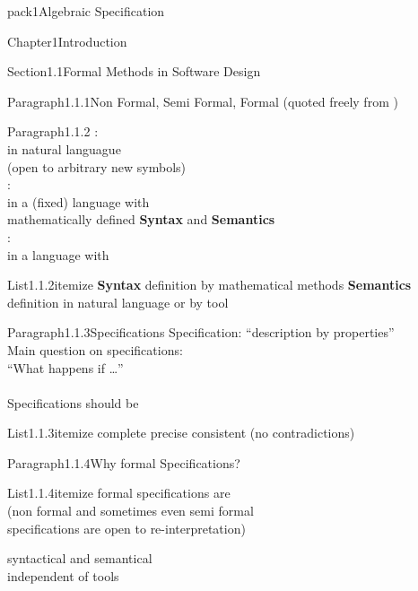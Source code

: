 \documentclass[landscape, slides, light]{mmiss2}
\begin{document}
\begin{Package}{pack1}{Algebraic
Specification}
\begin{Section}{Chapter1}{Introduction}
\begin{Section}{Section1.1}{Formal Methods in Software Design}{}
\begin{Paragraph}{Paragraph1.1.1}{Non Formal, Semi Formal, Formal}{}
(quoted freely from \cite{bowen99})
\end{Paragraph}
\begin{Paragraph}{Paragraph1.1.2}{}{}
:\\
in natural languague \\
(open to arbitrary new symbols)\\
\newline
{}: \\
in a (fixed) language with \\
mathematically defined {\bf Syntax} and {\bf Semantics}\\

: \\
in a language with
\begin{List}{List1.1.2}{itemize}{}
\ListItem{}
 {{\bf Syntax} definition by mathematical methods}
\ListItem{} 
{{\bf Semantics} definition in natural language or by tool}
\end{List}
\end{Paragraph}

\begin{Paragraph}{Paragraph1.1.3}{Specifications}{}
Specification: ``description by properties''\\

Main question on specifications:\\
``What happens if \dots'' \\ \\

Specifications should be \pause
\begin{List}{List1.1.3}{itemize}{}
\ListItem{}
{complete \pause}
\ListItem{}
{precise \pause}
\ListItem{}
{consistent (no contradictions)}
\end{List}
\end{Paragraph}
\begin{Paragraph}{Paragraph1.1.4}{Why formal Specifications?}{}
\begin{List}{List1.1.4}{itemize}{}
\ListItem{}
{formal specifications are   \\
          (non formal and sometimes even semi formal \\
          specifications are open to re-interpretation)\pause}


\ListItem{}
{syntactical and semantical  \\
          independent of tools \pause}


\end{List}
\end{Paragraph}
\end{Section}
\end{Section}
\end{Package}
\end{document}
